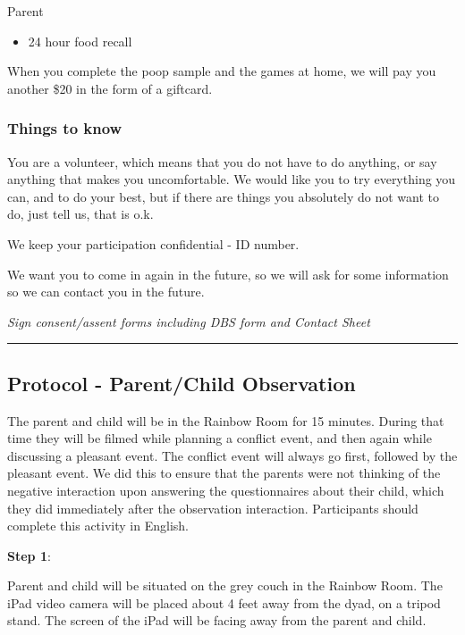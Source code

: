 \documentclass[]{book}
\providecommand{\tightlist}{%
  \setlength{\itemsep}{0pt}\setlength{\parskip}{0pt}}
\begin{document}
Parent

\begin{itemize}
\tightlist
\item
  24 hour food recall
\end{itemize}

When you complete the poop sample and the games at home, we will pay you another \$20 in the form of a giftcard.

\hypertarget{things-to-know}{%
\subsubsection{Things to know}\label{things-to-know}}

You are a volunteer, which means that you do not have to do anything, or say anything that makes you uncomfortable. We would like you to try everything you can, and to do your best, but if there are things you absolutely do not want to do, just tell us, that is o.k.

We keep your participation confidential - ID number.

We want you to come in again in the future, so we will ask for some information so we can contact you in the future.

\emph{Sign consent/assent forms including DBS form and Contact Sheet}

\begin{center}\rule{0.5\linewidth}{0.5pt}\end{center}

\hypertarget{protocol---parentchild-observation}{%
\subsection{Protocol - Parent/Child Observation}\label{protocol---parentchild-observation}}

The parent and child will be in the Rainbow Room for 15 minutes. During that time they will be filmed while planning a conflict event, and then again while discussing a pleasant event. The conflict event will always go first, followed by the pleasant event. We did this to ensure that the parents were not thinking of the negative interaction upon answering the questionnaires about their child, which they did immediately after the observation interaction. Participants should complete this activity in English.

\textbf{Step 1}:

Parent and child will be situated on the grey couch in the Rainbow Room. The iPad video camera will be placed about 4 feet away from the dyad, on a tripod stand. The screen of the iPad will be facing away from the parent and child.
\end{document}
